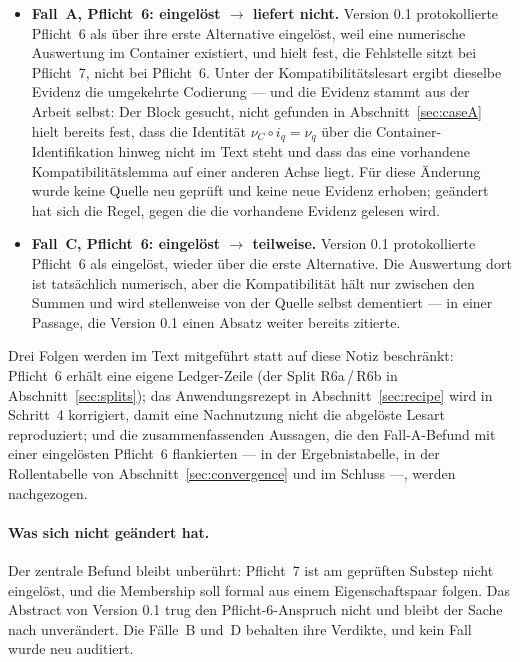 \documentclass[11pt,a4paper]{article}
\theoremstyle{definition}
\begin{document}
\begin{itemize}
\item \textbf{Fall~A, Pflicht~6: eingelöst $\rightarrow$ liefert nicht.} Version
  0.1 protokollierte Pflicht~6 als \glqq über ihre erste Alternative\grqq{} eingelöst, weil
  eine numerische Auswertung im Container existiert, und hielt fest, \glqq die
  Fehlstelle sitzt bei Pflicht~7, nicht bei Pflicht~6\grqq. Unter der
  Kompatibilitätslesart ergibt dieselbe Evidenz die umgekehrte Codierung --- und
  die Evidenz stammt aus der Arbeit selbst: Der Block \glqq gesucht, nicht gefunden\grqq
  in Abschnitt~\ref{sec:caseA} hielt bereits fest, dass die Identität
  $\nu_C \circ i_q = \nu_q$ über die Container-Identifikation hinweg nicht im
  Text steht und dass das eine vorhandene Kompatibilitätslemma auf einer anderen
  Achse liegt. Für diese Änderung wurde keine Quelle neu geprüft und keine neue
  Evidenz erhoben; geändert hat sich die Regel, gegen die die vorhandene Evidenz
  gelesen wird.
\item \textbf{Fall~C, Pflicht~6: eingelöst $\rightarrow$ teilweise.} Version 0.1
  protokollierte Pflicht~6 als eingelöst, wieder über die erste Alternative. Die
  Auswertung dort ist tatsächlich numerisch, aber die Kompatibilität hält nur
  zwischen den Summen und wird stellenweise von der Quelle selbst dementiert ---
  in einer Passage, die Version 0.1 einen Absatz weiter bereits zitierte.
\end{itemize}

Drei Folgen werden im Text mitgeführt statt auf diese Notiz beschränkt: Pflicht~6
erhält eine eigene Ledger-Zeile (der Split R6a\,/\,R6b in
Abschnitt~\ref{sec:splits}); das Anwendungsrezept in Abschnitt~\ref{sec:recipe}
wird in Schritt~4 korrigiert, damit eine Nachnutzung nicht die abgelöste Lesart
reproduziert; und die zusammenfassenden Aussagen, die den Fall-A-Befund mit einer
eingelösten Pflicht~6 flankierten --- in der Ergebnistabelle, in der Rollentabelle
von Abschnitt~\ref{sec:convergence} und im Schluss ---, werden nachgezogen.

\paragraph{Was sich nicht geändert hat.} Der zentrale Befund bleibt unberührt:
Pflicht~7 ist am geprüften Substep nicht eingelöst, und die Membership soll
\glqq formal\grqq{} aus einem Eigenschaftspaar folgen. Das Abstract von Version 0.1 trug den
Pflicht-6-Anspruch nicht und bleibt der Sache nach unverändert. Die Fälle~B
und~D behalten ihre Verdikte, und kein Fall wurde neu auditiert.
\end{document}

